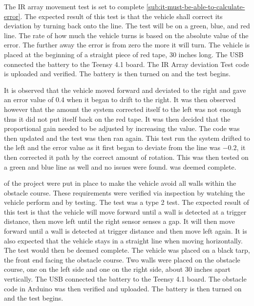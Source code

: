 \documentclass[11pt]{report}
\begin{document}
\label{tst:ir-array-movement}
The \gls{IR} array movement test is set to complete \cref{sub:it-must-be-able-to-calculate-error}. The expected result of this test is that the vehicle shall correct its deviation by turning back onto the line. The test will be on a green, blue, and red line. The rate of how much the vehicle turns is based on the absolute value of the error. The further away the error is from zero the more it will turn. The vehicle is placed at the beginning of a straight piece of red tape, 30 inches long. The USB connected the battery to the Teensy 4.1 board. The \gls{IR} Array deviation Test code is uploaded and verified. The battery is then turned on and the test begins. 

It is observed that the vehicle moved forward and deviated to the right and gave an error value of 0.4 when it began to drift to the right. It was then observed however that the amount the system corrected itself to the left was not enough thus it did not put itself back on the red tape. It was then decided that the proportional gain needed to be adjusted by increasing the value. The code was then updated and the test was then ran again. This test run the system drifted to the left and the error value as it first began to deviate from the line was $-0.2$, it then corrected it path by the correct amount of rotation. This was then tested on a green and blue line as well and no issues were found.  was deemed complete.


\label{tst:avoidance-of-boundaries-of-walls}
 of the project were put in place to make the vehicle avoid all walls within the obstacle course. These requirements were verified via inspection by watching the vehicle perform and by testing. The test was a type 2 test. The expected result of this test is that the vehicle will move forward until a wall is detected at a trigger distance, then move left until the right sensor senses a gap. It will then move forward until a wall is detected at trigger distance and then move left again. It is also expected that the vehicle stays in a straight line when moving horizontally. The test would then be deemed complete. The vehicle was placed on a black tarp, the front end facing the obstacle course. Two walls were placed on the obstacle course, one on the left side and one on the right side, about 30 inches apart vertically.  The USB connected the battery to the Teensy 4.1 board. The obstacle code in Arduino was then verified and uploaded. The battery is then turned on and the test begins. 
\end{document}
